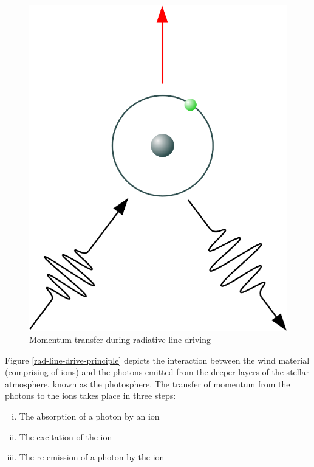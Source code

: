 		\begin{figure}[h!]
			\centering
			\includegraphics[scale=1.0]{rad-line-drive-04}
			\caption{Momentum transfer during radiative line driving}
			\label{rad-line-drive-momentum}
		\end{figure}
		Figure \ref{rad-line-drive-principle} depicts the interaction between the wind material (comprising of ions) and the photons emitted from the deeper layers of the stellar atmosphere, known as the photosphere. The transfer of momentum from the photons to the ions takes place in three steps:
		\begin{enumerate}[i.]
			\item The absorption of a photon by an ion
			\item The excitation of the ion
			\item The re-emission of a photon by the ion
		\end{enumerate}
